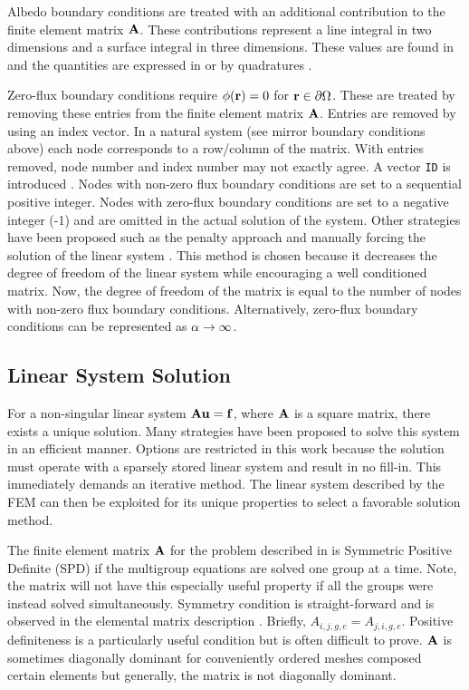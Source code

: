     Albedo boundary conditions are treated with an additional contribution to 
    the finite element matrix $\mathbf{A}$. These contributions represent a line 
    integral in two dimensions and a surface integral in three dimensions. These
    values are found in  and the quantities are 
    expressed in  or by quadratures 
    .
    
    Zero-flux boundary conditions require $\phi(\mathbf{r}) = 0$ for 
    $\mathbf{r} \in \partial \Omega$. These are treated by removing these entries from
    the finite element matrix $\mathbf{A}$. Entries are removed by using an index 
    vector. In a natural system (see mirror boundary conditions above) each node
    corresponds to a row/column of the matrix. With entries removed, node number
    and index number may not exactly agree. A vector \texttt{ID} is introduced
    \cite{textbookjohnson}. Nodes with non-zero flux boundary conditions are set
    to a sequential positive integer. Nodes with zero-flux boundary conditions 
    are set to a negative integer (-1) and are omitted in the actual solution of 
    the system. Other strategies have been proposed such as the penalty approach 
    \cite{textbookhughes} and manually forcing the solution of the linear system 
    \cite{textbookli}. This method is chosen because it decreases the degree of 
    freedom of the linear system while encouraging a well conditioned matrix. 
    Now, the degree of freedom of the matrix is equal to the number of nodes 
    with non-zero flux boundary conditions. Alternatively, zero-flux boundary
    conditions can be represented as $\alpha \rightarrow \infty$.
    
  \subsection{Linear System Solution}
    \label{sec:linear_system_solution}
    For a non-singular linear system $\mathbf{A} \mathbf{u} = \mathbf{f}$, where $\mathbf{A}$ is a square 
    matrix, there exists a unique solution. Many strategies have been proposed 
    to solve this system in an efficient manner. Options are restricted in this
    work because the solution must operate with a sparsely stored linear 
    system and result in no fill-in. This immediately demands an iterative 
    method. The linear system described by the FEM can then be exploited for its 
    unique properties to select a favorable solution method.
    
    The finite element matrix $\mathbf{A}$ for the problem described in 
     is Symmetric Positive Definite (SPD) if the
    multigroup equations are solved one group at a time. Note, the matrix will
    not have this especially useful property if all the groups were instead 
    solved simultaneously. Symmetry condition is straight-forward and is 
    observed in the elemental matrix description . 
    Briefly, ${A_{i,j,g,e}=A_{j,i,g,e}}$.
    Positive definiteness is a particularly useful condition but is often 
    difficult to prove. $\mathbf{A}$ is sometimes diagonally dominant for conveniently
    ordered meshes composed certain elements but generally, the matrix is not 
    diagonally dominant. 
    
